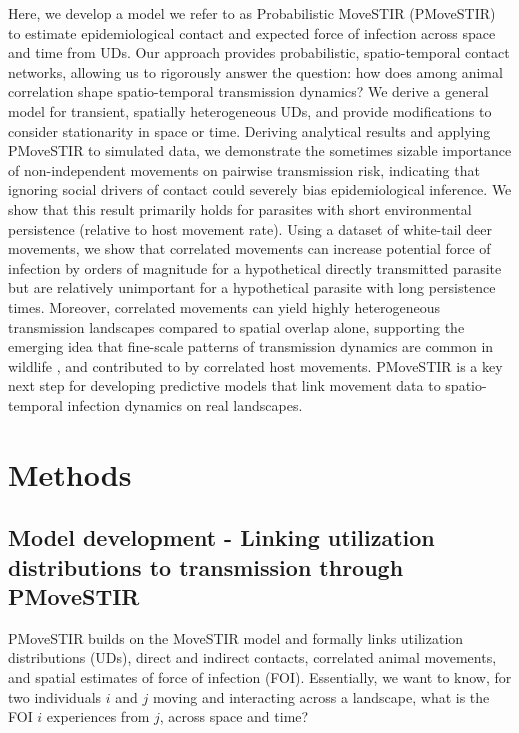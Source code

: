\documentclass[letterpaper]{article}
\begin{document}
Here, we develop a model we refer to as Probabilistic MoveSTIR (PMoveSTIR) to estimate epidemiological contact and expected force of infection across space and time from UDs. Our approach provides probabilistic, spatio-temporal contact networks, allowing us to rigorously answer the question: how does among animal correlation shape spatio-temporal transmission dynamics? We derive a general model for transient, spatially heterogeneous UDs, and provide modifications to consider stationarity in space or time.
Deriving analytical results and applying PMoveSTIR to simulated data, we demonstrate the sometimes sizable importance of non-independent movements on pairwise transmission risk, indicating that ignoring social drivers of contact could severely bias epidemiological inference. We show that this result primarily holds for parasites with short environmental persistence (relative to host movement rate). %
Using a dataset of white-tail deer movements, we show that correlated movements can increase potential force of infection by orders of magnitude for a hypothetical directly transmitted parasite but are relatively unimportant for a hypothetical parasite with long persistence times. Moreover, correlated movements can yield highly heterogeneous transmission landscapes compared to spatial overlap alone, supporting the emerging idea that fine-scale patterns of transmission dynamics are common in wildlife \citep{Albery2021}, and contributed to by correlated host movements. PMoveSTIR is a key next step for developing predictive models that link movement data to spatio-temporal infection dynamics on real landscapes.

\section*{Methods}

\subsection*{Model development - Linking utilization distributions to transmission through PMoveSTIR}

PMoveSTIR builds on the MoveSTIR model \citep{Wilber2022} and formally links utilization distributions (UDs), direct and indirect contacts, correlated animal movements, and spatial estimates of force of infection (FOI). Essentially, we want to know, for two individuals $i$ and $j$ moving and interacting across a landscape, what is the FOI $i$ experiences from $j$, across space and time?  
\end{document}
